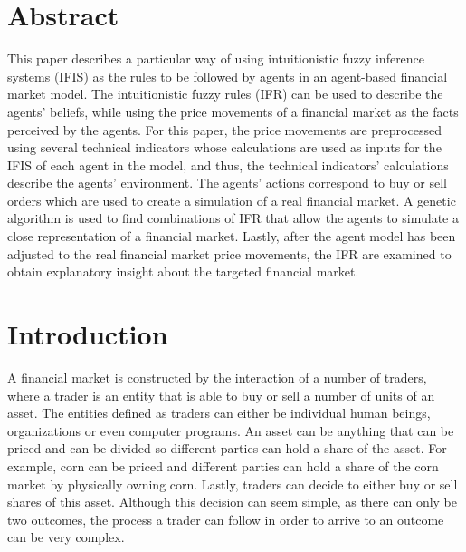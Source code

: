 \documentclass[10pt,letterpaper]{article}
\begin{document}
\section*{Abstract}
This paper describes a particular way of using intuitionistic fuzzy inference systems (IFIS) as the rules to be followed by agents in an agent-based financial market model. The intuitionistic fuzzy rules (IFR) can be used to describe the agents' beliefs, while using the price movements of a financial market as the facts perceived by the agents. For this paper, the price movements are preprocessed using several technical indicators whose calculations are used as inputs for the IFIS of each agent in the model, and thus, the technical indicators' calculations describe the agents' environment. The agents' actions correspond to buy or sell orders which are used to create a simulation of a real financial market. A genetic algorithm is used to find combinations of IFR that allow the agents to simulate a close representation of a financial market. Lastly, after the agent model has been adjusted to the real financial market price movements, the IFR are examined to obtain explanatory insight about the targeted financial market.



\linenumbers

\section*{Introduction}

A financial market is constructed by the interaction of a number of traders, where a trader is an entity that is able to buy or sell a number of units of an asset. The entities defined as traders can either be individual human beings, organizations or even computer programs. An asset can be anything that can be priced and can be divided so different parties can hold a share of the asset. For example, corn can be priced and different parties can hold a share of the corn market by physically owning corn. Lastly, traders can decide to either buy or sell shares of this asset. Although this decision can seem simple, as there can only be two outcomes, the process a trader can follow in order to arrive to an outcome can be very complex.
\end{document}
